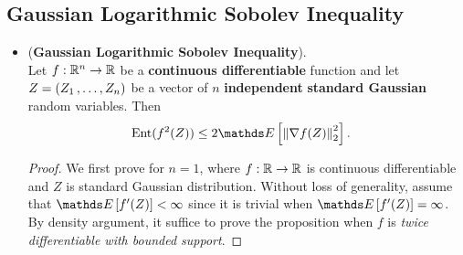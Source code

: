 \documentclass[11pt]{article}
\begin{document}
\subsection{Gaussian Logarithmic Sobolev Inequality}
\begin{itemize}
\item \begin{proposition} (\textbf{Gaussian Logarithmic Sobolev Inequality}). \citep{boucheron2013concentration}\\
Let $f: {\mathbb R}^n \to {\mathbb R}$ be a \textbf{continuous differentiable} function and let $Z = (Z_1 \,{,}\ldots{,}\, Z_n)$ be a vector of $n$ \textbf{independent} \textbf{standard Gaussian} random variables. Then
\begin{align}
\text{Ent}(f^2(Z)) &\le 2\E{}{\norm{\nabla f(Z)}{2}^2}.  \label{ineqn: log_sobolev_inequality_gaussian}
\end{align}
\end{proposition}
\begin{proof}
We first prove for $n=1$, where $f: {\mathbb R} \rightarrow {\mathbb R}$ is continuous differentiable and $Z$ is standard Gaussian distribution. Without loss of generality, assume that $\E{}{f'(Z)} < \infty$ since it is trivial when  $\E{}{f'(Z)} = \infty$. By density argument, it suffice to prove the proposition when $f$ is \emph{twice differentiable with bounded support}.


\end{proof}
\end{itemize}
\end{document}
